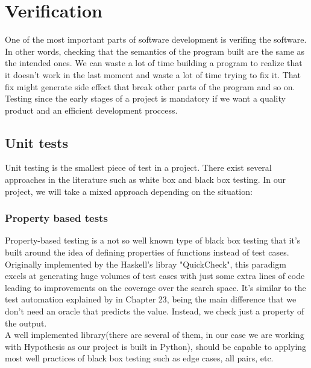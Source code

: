 \section{Verification}
  One of the most important parts of software development is verifing the
  software. In other words, checking that the semantics of the program built
  are the same as the intended ones. We can waste a lot of time building a
  program to realize that it doesn't work in the last moment and waste a lot
  of time trying to fix it. That fix might generate side effect that break other
  parts of the program and so on. Testing since the early stages of a project
  is mandatory if we want a quality product and an efficient development
  proccess.

  \subsection{Unit tests}

    Unit testing is the smallest piece of test in a project. There exist several
    approaches in the literature such as white box and black box testing. In
    our project, we will take a mixed approach depending on the situation:

    \subsubsection{Property based tests}

    Property-based testing is a not so well known type of black box testing that
    it's built around the idea of defining properties of functions instead of
    test cases. Originally implemented by the Haskell's libray
    "QuickCheck"\cite{QuickCheck}, this paradigm excels at generating huge
    volumes of test cases with just some extra lines of code leading
    to improvements on the coverage over the search space. It's similar to the
    test automation explained by \citet{Sommerville} in Chapter 23, being the
    main difference that we don't need an oracle that predicts the value.
    Instead, we check just a property of the output.\\

    A well implemented library(there are several of them, in our case we are
    working with Hypothesis\cite{Hypothesis} as our project is built in
    Python), should be capable to applying most well practices of black box
    testing such as edge cases, all pairs, etc.\\

